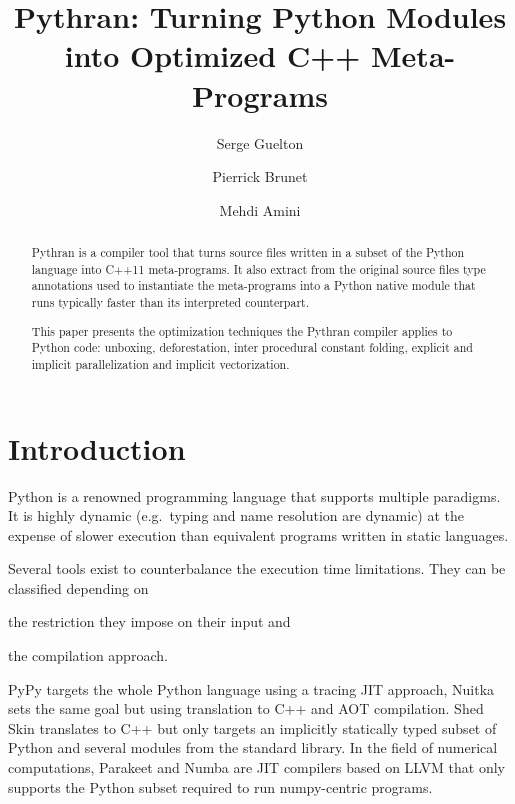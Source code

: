\documentclass{llncs}
\title{Pythran: Turning Python Modules into Optimized C++ Meta-Programs}
\author{Serge Guelton\inst{1,2} \and Pierrick Brunet\inst{2} \and Mehdi Amini\inst{3}}
\institute{École Normale Supérieure, Département d'Informatique, Paris, France
\and
Télécom Bretagne, Plouzané, France
\and
SILKAN Inc., Los-Altos, USA
}
\begin{document}
\maketitle

\begin{abstract}

    Pythran is a compiler tool that turns source files written in a subset of
    the Python language into C++11 meta-programs. It also extract from the
    original source files type annotations used to instantiate the meta-programs
    into a Python native module that runs typically faster than its interpreted
    counterpart.

    This paper presents the optimization techniques the Pythran compiler applies
    to Python code: unboxing, deforestation, inter procedural constant folding,
    explicit and implicit parallelization and implicit vectorization.

\end{abstract}

\section{Introduction}

Python is a renowned programming language that supports multiple paradigms. It
is highly dynamic (e.g.\ typing and name resolution are dynamic) at the expense
of slower execution than equivalent programs written in static languages.

Several tools exist to counterbalance the execution time limitations. They can
be classified depending on
\begin{inparaenum}[1)]
\item the restriction they impose on their input and
\item the compilation approach.
\end{inparaenum}
PyPy\cite{pypy2009} targets the whole Python
language using a tracing \ac{JIT} approach, Nuitka\cite{nuitka2012} sets the same
goal but using translation to C++ and \ac{AOT} compilation. Shed
Skin\cite{shedskin2006} translates to C++ but only targets an implicitly statically
typed subset of Python and several modules from the standard library. In the
field of numerical computations, Parakeet\cite{parakeet2012} and
Numba\cite{numba2013} are \ac{JIT} compilers based on LLVM that
only supports the Python subset required to run numpy-centric programs.
\end{document}
